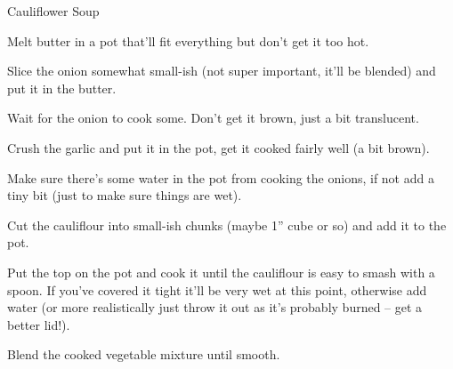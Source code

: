 \documentclass{recipe}
\begin{document}
\begin{recipe}{Cauliflower Soup}

  \begin{ingredients}
  \end{ingredients}

  \begin{steps}
  \item Melt butter in a pot that'll fit everything but don't get it
    too hot.
  \item Slice the onion somewhat small-ish (not super important, it'll
    be blended) and put it in the butter.
  \item Wait for the onion to cook some.  Don't get it brown, just a
    bit translucent.
  \item Crush the garlic and put it in the pot, get it cooked fairly
    well (a bit brown).
  \item Make sure there's some water in the pot from cooking the
    onions, if not add a tiny bit (just to make sure things are wet).
  \item Cut the cauliflour into small-ish chunks (maybe 1'' cube or
    so) and add it to the pot.
  \item Put the top on the pot and cook it until the cauliflour is
    easy to smash with a spoon.  If you've covered it tight it'll be
    very wet at this point, otherwise add water (or more realistically
    just throw it out as it's probably burned -- get a better lid!).
  \item Blend the cooked vegetable mixture until smooth.
  \end{steps}
\end{recipe}
\end{document}
